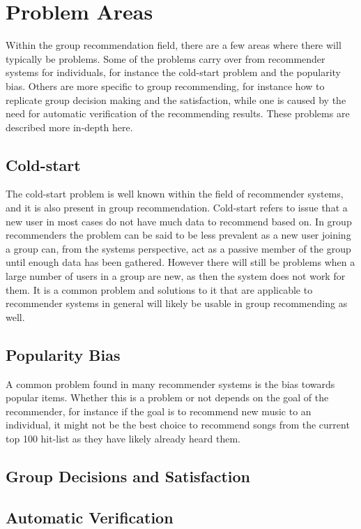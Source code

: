 \section{Problem Areas}

Within the group recommendation field, there are a few areas where there will typically be problems. Some of the problems carry over from recommender systems for individuals, for instance the cold-start problem and the popularity bias. Others are more specific to group recommending, for instance how to replicate group decision making and the satisfaction, while one is caused by the need for automatic verification of the recommending results. These problems are described more in-depth here. 

\subsection{Cold-start}
The cold-start problem is well known within the field of recommender systems, and it is also present in group recommendation. Cold-start refers to issue that a new user in most cases do not have much data to recommend based on. In group recommenders the problem can be said to be less prevalent as a new user joining a group can, from the systems perspective, act as a passive member of the group until enough data has been gathered. However there will still be problems when a large number of users in a group are new, as then the system does not work for them. It is a common problem and solutions to it that are applicable to recommender systems in general will likely be usable in group recommending as well.

\subsection{Popularity Bias}
A common problem found in many recommender systems is the bias towards popular items. Whether this is a problem or not depends on the goal of the recommender, for instance if the goal is to recommend new music to an individual, it might not be the best choice to recommend songs from the current top 100 hit-list as they have likely already heard them. 

\subsection{Group Decisions and Satisfaction}

\subsection{Automatic Verification}